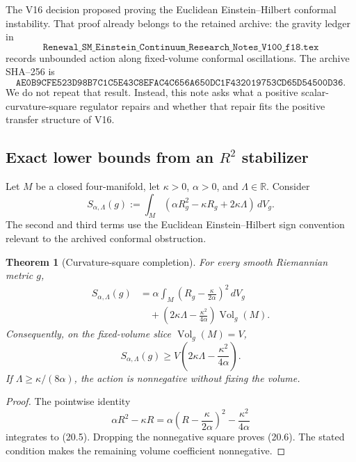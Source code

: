 \documentclass[11pt]{article}
\newtheorem{theorem}{Theorem}[section]
\theoremstyle{remark}
\begin{document}
The V16 decision proposed proving the Euclidean Einstein--Hilbert
conformal instability.  That proof already belongs to the retained
archive: the gravity ledger in
\[
 \texttt{Renewal\_SM\_Einstein\_Continuum\_Research\_Notes\_V100\_f18.tex}
\]
records unbounded action along fixed-volume conformal oscillations.  The
archive SHA--256 is
\[
 \texttt{AE0B9CFE523D98B7C1C5E43C8EFAC4C656A650DC1F432019753CD65D54500D36}.
                                                               \tag{20.3}
\]
We do not repeat that result.  Instead, this note asks what a positive
scalar-curvature-square regulator repairs and whether that repair fits the
positive transfer structure of V16.

\subsection{Exact lower bounds from an \(R^2\) stabilizer}

Let \(M\) be a closed four-manifold, let \(\kappa>0\),
\(\alpha>0\), and \(\Lambda\in\mathbb R\).  Consider
\[
 S_{\alpha,\Lambda}(g)
 :=\int_M\left(\alpha R_g^2-\kappa R_g+2\kappa\Lambda\right)
 \,dV_g.                                                        \tag{20.4}
\]
The second and third terms use the Euclidean Einstein--Hilbert sign
convention relevant to the archived conformal obstruction.

\begin{theorem}[Curvature-square completion]
\label{thm:v19v17-completion}
For every smooth Riemannian metric \(g\),
\[
\begin{split}
 S_{\alpha,\Lambda}(g)
 &=
 \alpha\int_M
 \left(R_g-\frac{\kappa}{2\alpha}\right)^2\,dV_g\\
 &\quad+
 \left(2\kappa\Lambda-\frac{\kappa^2}{4\alpha}\right)
 \operatorname{Vol}_g(M).                                     \tag{20.5}
\end{split}
\]
Consequently, on the fixed-volume slice
\(\operatorname{Vol}_g(M)=V\),
\[
 S_{\alpha,\Lambda}(g)
 \geq V\left(2\kappa\Lambda-\frac{\kappa^2}{4\alpha}\right).   \tag{20.6}
\]
If \(\Lambda\geq\kappa/(8\alpha)\), the action is nonnegative without
fixing the volume.
\end{theorem}

\begin{proof}
The pointwise identity
\[
 \alpha R^2-\kappa R
 =\alpha\left(R-\frac{\kappa}{2\alpha}\right)^2
  -\frac{\kappa^2}{4\alpha}
\]
integrates to (20.5).  Dropping the nonnegative square proves (20.6).
The stated condition makes the remaining volume coefficient nonnegative.
\end{proof}
\end{document}
